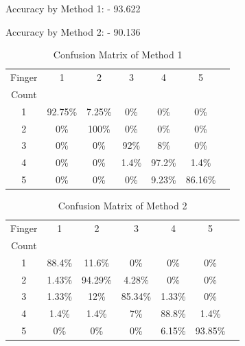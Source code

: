 \documentclass[conference]{IEEEtran}
\begin{document}
Accuracy by Method 1: - 93.622%

Accuracy by Method 2: - 90.136%
%
%



\begin{table}[h]
\caption{Confusion Matrix of Method 1}
\begin{center}
\begin{tabular}{|c|c|c|c|c|c|c|}
\hline
\multicolumn{1}{|c|}{Finger}
& \multicolumn{1}{|c|}{1}
& \multicolumn{1}{|c|}{2}
& \multicolumn{1}{|c|}{3}
& \multicolumn{1}{|c|}{4}
& \multicolumn{1}{|c|}{5}\\
Count &  &  &  &  &\\ \hline
1  &  92.75\%  &  7.25\%  & 0\%  & 0\% & 0\%\\ \hline
2  &  0\%  &  100\%  & 0\%  & 0\% & 0\%\\ \hline
3  &  0\%  &  0\%  & 92\%  & 8\% & 0\%\\ \hline
4  &  0\%  &  0\%  & 1.4\%  & 97.2\% & 1.4\%\\ \hline
5  &  0\%  &  0\%  & 0\%  & 9.23\% & 86.16\%\\ \hline
\end{tabular}
\label{table-tab2}
\end{center}
\end{table}

\begin{table}[h]
\caption{Confusion Matrix of Method 2}
\begin{center}
\begin{tabular}{|c|c|c|c|c|c|c|}
\hline
\multicolumn{1}{|c|}{Finger}
& \multicolumn{1}{|c|}{1}
& \multicolumn{1}{|c|}{2}
& \multicolumn{1}{|c|}{3}
& \multicolumn{1}{|c|}{4}
& \multicolumn{1}{|c|}{5}\\
Count &  &  &  &  &\\ \hline
1  &  88.4\%  &  11.6\%  & 0\%  & 0\% & 0\%\\ \hline
2  &  1.43\%  &  94.29\%  & 4.28\%  & 0\% & 0\%\\ \hline
3  &  1.33\%  &  12\%  & 85.34\%  & 1.33\% & 0\%\\ \hline
4  &  1.4\%  &  1.4\%  & 7\%  & 88.8\% & 1.4\%\\ \hline
5  &  0\%  &  0\%  & 0\%  & 6.15\% & 93.85\%\\ \hline
\end{tabular}
\label{table-tab2}
\end{center}
\end{table}
\end{document}
